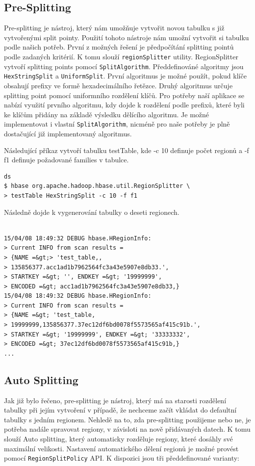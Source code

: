 \documentclass[thesis=M,czech]{FITthesis}[2012/06/26]
\begin{document}
\subsection{Pre-Splitting}
Pre-splitting je nástroj, který nám umožňuje vytvořit novou tabulku s již vytvořenými split pointy. Použití tohoto nástroje nám umožní vytvořit si tabulku podle našich potřeb. První z možných řešení je předpočítání splitting pointů podle zadaných kritérií. K tomu slouží \texttt{regionSplitter} utility. RegionSplitter vytvoří splitting points pomocí \texttt{SplitAlgorithm}. Předdefinováné algoritmy jsou \texttt{HexStringSplit} a \texttt{UniformSplit}. První algoritmus je možné použít, pokud klíče obsahují prefixy ve formě hexadecimálního řetězce. Druhý algoritmus určuje splitting point pomocí uniformního rozdělení klíčů. Pro potřeby naší aplikace se nabízí využití prvního algoritmu, kdy dojde k rozdělení podle prefixů, které byli ke klíčům přidány na základě výsledku dělícího algoritmu. Je možné implementovat i vlastní \texttt{SplitAlgorithm}, nicméně pro naše potřeby je plně dostačující již implementovaný algoritmus.

Následující příkaz vytvoří tabulku testTable, kde -c 10 definuje počet regionů a -f f1 definuje požadované families v tabulce.

\medskip
\begin{lstlisting}[frame=single]  % Start your code-block
ds
$ hbase org.apache.hadoop.hbase.util.RegionSplitter \
> testTable HexStringSplit -c 10 -f f1

\end{lstlisting}
\medskip
Následně dojde k vygenerování tabulky o deseti regionech.
\medskip
\begin{lstlisting}[frame=single]  % Start your code-block
 
15/04/08 18:49:32 DEBUG hbase.HRegionInfo:
> Current INFO from scan results = 
> {NAME =&gt;> 'test_table,,
> 135856377.acc1ad1b7962564fc3a43e5907e8db33.', 
> STARTKEY =&gt; '', ENDKEY =&gt; '19999999', 
> ENCODED =&gt; acc1ad1b7962564fc3a43e5907e8db33,}
15/04/08 18:49:32 DEBUG hbase.HRegionInfo: 
> Current INFO from scan results = 
> {NAME =&gt; 'test_table,
> 19999999,135856377.37ec12df6bd0078f5573565af415c91b.', 
> STARTKEY =&gt; '19999999', ENDKEY =&gt; '33333332', 
> ENCODED =&gt; 37ec12df6bd0078f5573565af415c91b,}
...

\end{lstlisting}
\medskip
\subsection{Auto Splitting}
Jak již bylo řečeno, pre-splitting je nástroj, který má na starosti rozdělení tabulky při jejím vytvoření v případě, že nechceme začít vkládat do defaultní tabulky s jedním regionem. Nehledě na to, zda pre-splitting použijeme nebo ne, je potřeba nadále spravovat regiony, v závisloti na nově přidávaných datech. K tomu slouží Auto splitting, který automaticky rozděluje regiony, které dosáhly své maximální velikosti. Nastavení automatického dělení regionů je možné provést pomocí \texttt{RegionSplitPolicy} API. K dispozici jsou tři předdefinované varianty:
\end{document}
